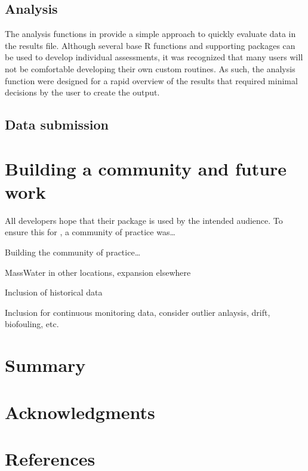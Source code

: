 \hypertarget{analysis}{%
\subsection{Analysis}\label{analysis}}

The analysis functions in  provide a simple approach to quickly evaluate data in the results file. Although several base R functions and supporting packages can be used to develop individual assessments, it was recognized that many users will not be comfortable developing their own custom routines. As such, the analysis function were designed for a rapid overview of the results that required minimal decisions by the user to create the output.

\hypertarget{data-submission}{%
\subsection{Data submission}\label{data-submission}}

\hypertarget{building-a-community-and-future-work}{%
\section{Building a community and future work}\label{building-a-community-and-future-work}}

All developers hope that their package is used by the intended audience. To ensure this for , a community of practice was\ldots{}

Building the community of practice\ldots{}

MassWater in other locations, expansion elsewhere

Inclusion of historical data

Inclusion for continuous monitoring data, consider outlier anlaysis, drift, biofouling, etc.

\hypertarget{summary}{%
\section{Summary}\label{summary}}

\hypertarget{acknowledgments}{%
\section{Acknowledgments}\label{acknowledgments}}

\hypertarget{references}{%
\section*{References}\label{references}}

